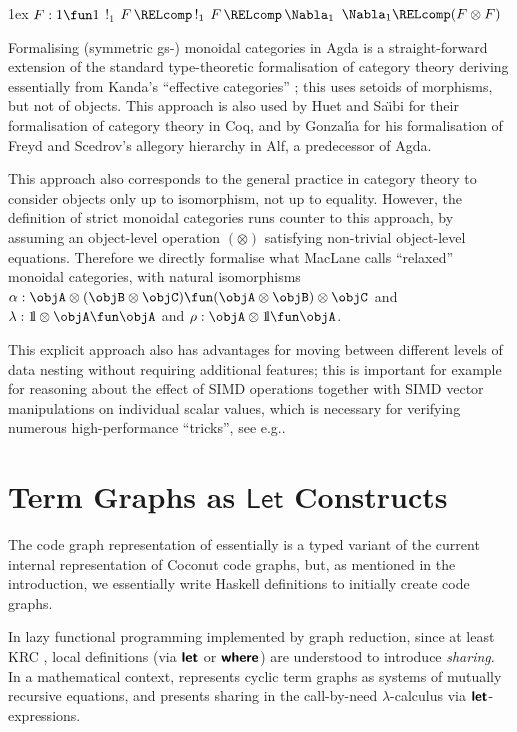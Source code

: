 \documentclass[copyright]{eptcs}
\newcommand{\Conid}[1]{\mathit{#1}}
\newcommand{\Varid}[1]{\mathit{#1}}
\renewcommand\Varid[1]{\mathord{\textsf{#1}}}
\let\Conid\Varid
\newcommand\Keyword[1]{\textsf{\textbf{#1}}}
\newcounter{x}
\newcounter{y}
\newcounter{z}
\def\triv{\mathds{1}}
\def\bbbone{{\mathchoice {\rm 1\mskip-4mu l} {\rm 1\mskip-4mu l}
{\rm 1\mskip-4.5mu l} {\rm 1\mskip-5mu l}}}
\def\triv{\bbbone}
\begin{document}
\kern1ex
\noindent
\phantom{.}\hfill
$F : 1 \fun 1$
\hfill
$!_1$\quad
\hfill
$F \,\RELcomp\, !_1$\quad
\hfill
$F \,\RELcomp\, \Nabla_1$\quad
\hfill
$\Nabla_1 \RELcomp (F \otimes F)$
\hfill
\strut


\bigskip
\noindent
Formalising (symmetric gs-) monoidal categories in Agda is
a straight-forward extension of the standard type-theoretic
formalisation of category theory deriving essentially from
Kanda's ``effective categories'' \cite{Kanda-1981};
this uses setoids of morphisms,
but not of objects.
This approach is also used by
Huet and Sa{\"{\i}}bi \cite{Huet-Saibi-1998,Huet-Saibi-2000}
for their formalisation of category theory in Coq,
and by Gonzal{\'{\i}}a  \cite{Gonzalia-2006}
for his formalisation of Freyd and Scedrov's allegory hierarchy \cite{Freyd-Scedrov-1990}
in Alf, a predecessor of Agda.

This approach also corresponds to the general practice
in category theory to consider objects only up to isomorphism,
not up to equality.
However, the definition of strict monoidal categories runs counter to
this approach, by assuming an object-level operation $(\otimes)$
satisfying non-trivial object-level equations.
Therefore we directly formalise what MacLane calls ``relaxed''
monoidal categories, with natural isomorphisms
$
\alpha : 
     \objA \otimes (\objB \otimes \objC)
   \fun
     (\objA \otimes \objB) \otimes \objC
$ and $\lambda : \triv \otimes \objA \fun \objA$
and $\rho : \objA \otimes \triv \fun \objA$.

This explicit approach also has advantages for moving
between different levels of data nesting without requiring additional
features;
this is important for example for reasoning about the effect of SIMD
operations together with SIMD vector manipulations on individual
scalar values, which is necessary for verifying numerous
high-performance ``tricks'', see e.g.\null \cite{Anand-Kahl-2007_AGTIVE}. 


\section{Term Graphs as \ensuremath{\Conid{Let}} Constructs}

The code graph representation of 
essentially is a typed variant of the current internal representation
of Coconut code graphs, but, as mentioned in the introduction,
we essentially write Haskell definitions
to initially create code graphs.

In lazy functional programming implemented by graph reduction,
since at least KRC \cite{Turner-1982},
local definitions (via \ensuremath{\Keyword{let}} or \ensuremath{\Keyword{where}}) are 
understood to introduce \emph{sharing}.
In a mathematical context, 
\cite{Ariola-Klop-1994} represents cyclic term graphs
as systems of mutually recursive equations,
and \cite{Maraist-Oderski-Wadler-1998} presents sharing in the
call-by-need $\lambda$-calculus via \ensuremath{\Keyword{let}}-expressions.
\end{document}
